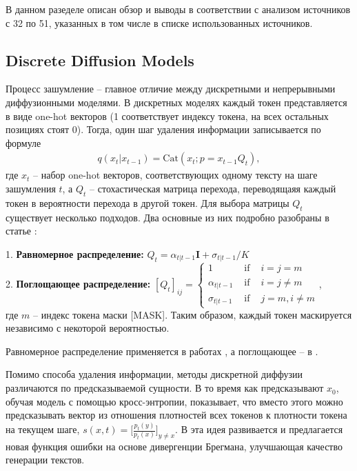 \documentclass[a4paper, 12pt]{article}
\begin{document}
В данном разеделе описан обзор и выводы в соответствии с анализом источников с 32 по 51, указанных в том числе в списке использованных источников.


\subsection{Discrete Diffusion Models}

Процесс зашумление – главное отличие между дискретными и непрерывными диффузионными моделями. В дискретных моделях каждый токен представляется в виде one-hot векторов (1 соответствует индексу токена, на всех остальных позициях стоят 0). Тогда, один шаг удаления информации записывается по формуле
\begin{align}
q(x_t | x_{t-1}) = \text{Cat}(x_t; p = x_{t-1}Q_t),
\end{align}
где $x_t$ – набор one-hot векторов, соответствующих одному тексту на шаге зашумления  $t$, а $Q_t$ – стохастическая матрица перехода, переводящаяя каждый токен в вероятности перехода в другой токен. Для выбора матрицы $Q_t$ существует несколько подходов. Два основные из них подробно разобраны в статье \cite{d3pm}:

1. \textbf{Равномерное распределение:} $Q_t = \alpha_{t|t-1} \boldsymbol{I} + \sigma_{t|t-1} / K$ \\

2. \textbf{Поглощающее распределение:} $[Q_t]_{i j}=\left\{\begin{array}{lll}
1 & \text { if } & i=j=m \\
\alpha_{t|t-1} & \text { if } & i=j \neq m \\
\sigma_{t|t-1} & \text { if } & j=m, i \neq m
\end{array}\right.
$, \\
где $m$ – индекс токена маски [MASK]. Таким образом, каждый токен маскируется независимо с некоторой вероятностью.

Равномерное распределение применяется в работах \cite{mtd, sedd}, а поглощающее – в \cite{sedd, diffusionbert, diffusionnat, mdlm, simplifiedmaskeddiffusion}.

Помимо способа удаления информации, методы дискретной диффузии различаются по предсказываемой сущности. В то время как \cite{d3pm, diffusionbert, mtd, mdlm} предсказывают $x_0$, обучая модель с помощью кросс-энтропии, \cite{concretescorematching} показывает, что вместо этого можно предсказывать вектор из отношения плотностей всех токенов к плотности токена на текущем шаге, $s(x, t) = \bigg[\frac{p_t(y)}{p_t(x)}\bigg]_{y \neq x}$. В \cite{sedd} эта идея развивается и предлагается новая функция ошибки на основе дивергенции Брегмана, улучшающая качество генерации текстов.
\end{document}
